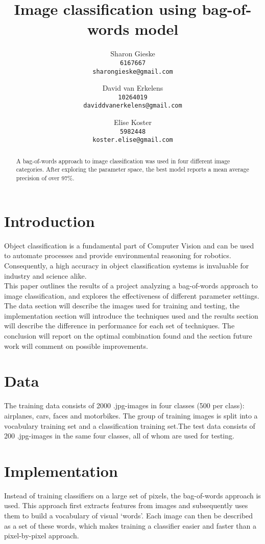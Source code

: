 \documentclass{article} %
\title{Image classification using bag-of-words model}
\author{
Sharon Gieske \\
\texttt{6167667}\\
\texttt{sharongieske@gmail.com} \\
\and
David van Erkelens\\
\texttt{10264019}\\
\texttt{daviddvanerkelens@gmail.com} \\
\and
Elise Koster \\
\texttt{5982448}\\
\texttt{koster.elise@gmail.com}
}
\begin{document}
\maketitle

\begin{abstract}
A bag-of-words approach to image classification was used in four different image categories. After exploring the parameter space, the best model reports a mean average precision of over 97\%.
\end{abstract}


\section{Introduction}
Object classification is a fundamental part of Computer Vision and can be used to automate processes and provide environmental reasoning for robotics. Consequently, a high accuracy in object classification systems is invaluable for industry and science alike.\\
This paper outlines the results of a project analyzing a bag-of-words approach to image classification, and explores the effectiveness of different parameter settings.\\
The data section will describe the images used for training and testing, the implementation section will introduce the techniques used and the results section will describe the difference in performance for each set of techniques. The conclusion will report on the optimal combination found and the section future work will comment on possible improvements.

\section{Data}
The training data consists of 2000 .jpg-images in four classes (500 per class): airplanes, cars, faces and motorbikes. The group of training images is split into a vocabulary training set and a classification training set.The test data consists of 200 .jpg-images in the same four classes, all of whom are used for testing.

\section{Implementation}
Instead of training classifiers on a large set of pixels, the bag-of-words approach is used. This approach first extracts features from images and subsequently uses them to build a vocabulary of visual `words'. Each image can then be described as a set of these words, which makes training a classifier easier and faster than a pixel-by-pixel approach. \\
\end{document}

